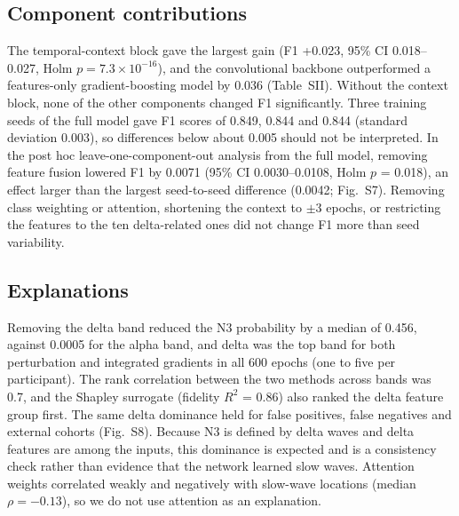 \subsection{Component contributions}
The temporal-context block gave the largest gain (F1 +0.023, 95\% CI 0.018--0.027, Holm $p = 7.3\times10^{-16}$), and the convolutional backbone outperformed a features-only gradient-boosting model by 0.036 (Table~SII). Without the context block, none of the other components changed F1 significantly. Three training seeds of the full model gave F1 scores of 0.849, 0.844 and 0.844 (standard deviation 0.003), so differences below about 0.005 should not be interpreted. In the post hoc leave-one-component-out analysis from the full model, removing feature fusion lowered F1 by 0.0071 (95\% CI 0.0030--0.0108, Holm $p$ = 0.018), an effect larger than the largest seed-to-seed difference (0.0042; Fig.~S7). Removing class weighting or attention, shortening the context to $\pm$3 epochs, or restricting the features to the ten delta-related ones did not change F1 more than seed variability. %



\subsection{Explanations}
Removing the delta band reduced the N3 probability by a median of 0.456, against 0.0005 for the alpha band, and delta was the top band for both perturbation and integrated gradients in all 600 epochs (one to five per participant). The rank correlation between the two methods across bands was 0.7, and the Shapley surrogate (fidelity $R^2$ = 0.86) also ranked the delta feature group first. The same delta dominance held for false positives, false negatives and external cohorts (Fig.~S8). Because N3 is defined by delta waves and delta features are among the inputs, this dominance is expected and is a consistency check rather than evidence that the network learned slow waves. Attention weights correlated weakly and negatively with slow-wave locations (median $\rho = -0.13$), so we do not use attention as an explanation. %

